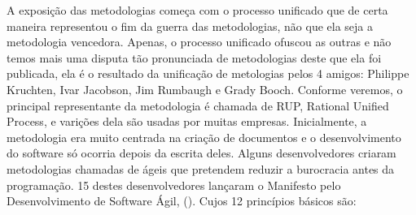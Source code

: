 \documentclass[
	11pt,				%
	openright,
	twoside,			%
	a4paper,			%
	english,			%
	french,
	brazil,				%
	sumario=tradicional
	]{abntex2}
\begin{document}
A exposição das metodologias começa com o processo unificado que de certa maneira representou o fim da guerra das metodologias, não que ela seja a metodologia vencedora. Apenas, o processo unificado ofuscou as outras e não temos mais uma disputa tão pronunciada de metodologias deste que ela foi publicada, ela é o resultado da unificação de metologias pelos 4 amigos: Philippe Kruchten,  Ivar Jacobson, Jim Rumbaugh e Grady Booch. Conforme veremos, o principal representante da metodologia é chamada de RUP, Rational Unified Process, e varições dela são usadas por muitas empresas. Inicialmente, a metodologia era muito centrada na criação de documentos e o desenvolvimento do software só ocorria depois da escrita deles. Alguns desenvolvedores criaram metodologias chamadas de ágeis que pretendem reduzir a burocracia antes da programação. 15 destes desenvolvedores lançaram o Manifesto pelo Desenvolvimento de Software Ágil, (). Cujos 12 princípios básicos são:
\end{document}
